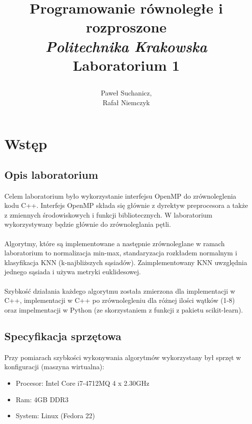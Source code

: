 \documentclass[a4paper,11pt]{article}
\title{
	\textbf{Programowanie równoległe i rozproszone}\vspace{40pt}
	\\\textit{Politechnika Krakowska} \\\vspace{40pt}
	Laboratorium 1
	\vspace{300pt}

}
\author{
	Paweł Suchanicz,\\
	Rafał Niemczyk
}
\begin{document}
\begin{titlepage}
\maketitle
\end{titlepage}

\begin{center}
\tableofcontents
\end{center}
\newpage
\section{Wstęp}
\subsection{Opis laboratorium}
\paragraph{}Celem laboratorium było wykorzystanie interfejsu OpenMP do zrównoleglenia kodu C++. Interfejs OpenMP składa się głównie z dyrektyw preprocesora a także z zmiennych środowiskowych i funkcji bibliotecznych. W laboratorium wykorzystywany będzie głównie do zrównoleglania pętli.
\paragraph{}Algorytmy, które są implementowane a następnie zrównoleglane w ramach laboratorium to normalizacja min-max, standaryzacja rozkładem normalnym i klasyfikacja KNN (k-najbliższych sąsiadów). Zaimplementowany KNN  uwzględnia jednego sąsiada i używa metryki euklidesowej.
\paragraph{}Szybkość działania każdego algorytmu została zmierzona dla implementacji w C++, implementacji w C++ po zrównolegleniu dla różnej ilości wątków (1-8) oraz impelmentacji w Python (ze skorzystaniem z funkcji z pakietu scikit-learn).
\subsection{Specyfikacja sprzętowa}
\paragraph{}Przy pomiarach szybkości wykonywania algorytmów wykorzystany był sprzęt w konfiguracji (maszyna wirtualna):
\begin{itemize}
\item Procesor: Intel Core i7-4712MQ 4 x 2.30GHz
\item Ram: 4GB DDR3
\item System: Linux (Fedora 22)
\end{itemize}
\end{document}
